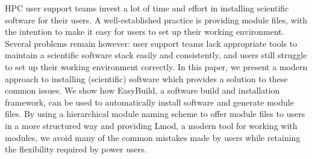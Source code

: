 
HPC user support teams invest a lot of time and effort in installing scientific
software for their users. A well-established practice is providing module files,
with the intention to make it easy for users to set up their working environment.
Several problems remain however: user support teams lack appropriate tools to
maintain a scientific software stack easily and consistently, and users still
struggle to set up their working environment correctly.
In this paper, we present a modern approach to installing (scientific) software which
provides a solution to these common issues. We show how EasyBuild, a software
build and installation framework, can be used to automatically install software
and generate module files.  By using a hierarchical module naming
scheme to offer module files to users in a more structured way and providing Lmod,
a modern tool for working with modules, we avoid many of the common mistakes made
by users while retaining the flexibility required by power users. 
